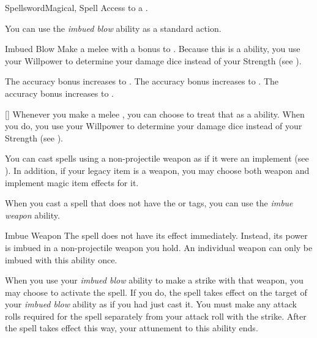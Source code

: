     \begin{feat}{Spellsword}{Magical, Spell}
        \featpre Access to a .

         You can use the \textit{imbued blow} ability as a standard action.
        \begin{freeability}{Imbued Blow}
            \rankline
            Make a melee  with a  bonus to .
            Because this is a  ability, you use your Willpower to determine your damage dice instead of your Strength (see ).

            \rankline
             The accuracy bonus increases to .
             The accuracy bonus increases to .
             The accuracy bonus increases to .
        \end{freeability}

        [] Whenever you make a melee , you can choose to treat that as a  ability.
        When you do, you use your Willpower to determine your damage dice instead of your Strength (see ).

         You can cast spells using a non-projectile weapon as if it were an implement (see ).
        In addition, if your legacy item is a weapon, you may choose both weapon and implement magic item effects for it.

         When you cast a spell that does not have the  or  tags,
            you can use the \textit{imbue weapon} ability.
        \begin{attuneability}{Imbue Weapon}
            \rankline
            The spell does not have its effect immediately.
            Instead, its power is imbued in a non-projectile weapon you hold.
            An individual weapon can only be imbued with this ability once.

            When you use your \textit{imbued blow} ability to make a strike with that weapon, you may choose to activate the spell.
            If you do, the spell takes effect on the target of your \textit{imbued blow} ability as if you had just cast it.
            You must make any attack rolls required for the spell separately from your attack roll with the strike.
            After the spell takes effect this way, your attunement to this ability ends.
        \end{attuneability}


\end{feat}
